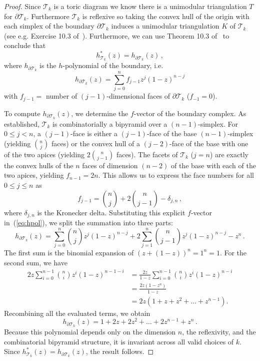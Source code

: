 \documentclass[a4paper,11pt,reqno]{amsart}
\begin{document}
\begin{proof}
Since $\mathcal{T}_k$ is a toric diagram we know there is a unimodular triangulation $T$ for $\partial \mathcal{T}_k$. 
Furthermore $\mathcal{T}_k$ is reflexive so taking the convex hull of the origin with each simplex of the boundary 
$\partial \mathcal{T}_k$ induces a unimodular triangulation $K$ of $\mathcal{T}_k$ (see e.g. Exercise 10.3 of~\cite{BR}).
Furthermore, we can use Theorem 10.3 of~\cite{BR} to conclude that 
\[
h_{\mathcal{T}_k}^\ast (z) = h_{\partial \mathcal{T}_k}(z) \,,
\]
where $h_{\partial \mathcal{T}_k}$ is the $h$-polynomial of the boundary, i.e.
\begin{equation} \label{eq:hpol}
h_{\partial \mathcal{T}_k}(z) = \sum_{j=0}^{n} f_{j-1} z^j (1-z)^{n-j} 
\end{equation}
with $f_{j-1} =$ number of $(j-1)$-dimensional faces of $\partial \mathcal{T}_k$ ($f_{-1} = 0$).
		
To compute $h_{\partial \mathcal{T}_k}(z)$, we determine the $f$-vector of the boundary complex. As established, 
$\mathcal{T}_k$ is combinatorially a bipyramid over a $(n-1)$-simplex. For $0 \le j < n$, a $(j-1)$-face is either a 
$(j-1)$-face of the base $(n-1)$-simplex (yielding $\binom{n}{j}$ faces) or the convex hull of a $(j-2)$-face of the base 
with one of the two apices (yielding $2\binom{n}{j-1}$ faces). The facets of $\mathcal{T}_k$ ($j=n$) are exactly the 
convex hulls of the $n$ faces of dimension $(n-2)$ of the base with each of the two apices, yielding $f_{n-1} = 2n$. 
This allows us to express the face numbers for all $0 \le j \le n$ as
\[
f_{j-1} = \binom{n}{j} + 2\binom{n}{j-1} - \delta_{j,n} \,,
\]
where $\delta_{j,n}$ is the Kronecker delta. Substituting this explicit $f$-vector in~(\ref{eq:hpol}), we split the summation 
into three parts:
\[
h_{\partial \mathcal{T}_k}(z) = \sum_{j=0}^{n} \binom{n}{j} z^j (1-z)^{n-j} + 2 \sum_{j=1}^{n} \binom{n}{j-1} z^j (1-z)^{n-j} - z^n\,. 
\]
The first sum is the binomial expansion of $(z + (1-z))^n = 1^n = 1$. For the second sum, we have
\begin{align*}
2z \sum_{i=0}^{n-1} \binom{n}{i} z^i (1-z)^{n-1-i} &= \frac{2z}{1-z} \sum_{i=0}^{n-1} \binom{n}{i} z^i (1-z)^{n-i} \\
&= \frac{2z(1-z^n)}{1-z}\\
&= 2z(1 + z + z^2 + \dots + z^{n-1}).
\end{align*}
Recombining all the evaluated terms, we obtain
\[ 
h_{\partial \mathcal{T}_k}(z) = 1 + 2z + 2z^2 + \dots + 2z^{n-1} + z^n\,. 
\]
Because this polynomial depends only on the dimension $n$, the reflexivity, and the combinatorial bipyramid structure, 
it is invariant across all valid choices of $k$. Since $h_{\mathcal{T}_k}^*(z) = h_{\partial \mathcal{T}_k}(z)$, the result 
follows.
\end{proof}
\end{document}

